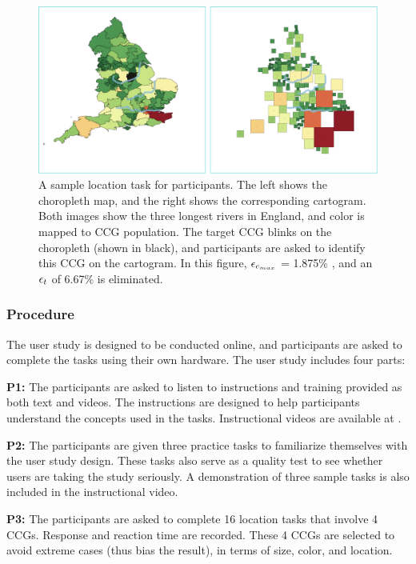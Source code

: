     {
        \begin{figure}[tb!]
            \centering
            \includegraphics[width=\columnwidth,keepaspectratio]{figure/evaluation/task.png}
            \caption{A sample location task for participants. The left shows the choropleth map, and the right shows the corresponding cartogram. Both images show the three longest rivers in England, and color is mapped to CCG population. The target CCG blinks on the choropleth (shown in black), and participants are asked to identify this CCG on the cartogram. In this figure, $ \epsilon_{c_{max}} $ = 1.875\% , and an $ \epsilon_{t} $ of 6.67\% is eliminated. }
            \label{fig:task}
        \end{figure}
    }

\subsubsection{Procedure}

The user study is designed to be conducted online, and participants are asked to complete the tasks using their own hardware. The user study includes four parts:

\textbf{P1:} The participants are asked to listen to instructions and training provided as both text and videos. The instructions are designed to help participants understand the concepts used in the tasks. Instructional videos are available at .

\textbf{P2:} The participants are given three practice tasks to familiarize themselves with the user study design. These tasks also serve as a quality test to see whether users are taking the study seriously. A demonstration of three sample tasks is also included in the instructional video.

\textbf{P3:} The participants are asked to complete 16 location tasks that involve 4 CCGs. Response and reaction time are recorded. These 4 CCGs are selected to avoid extreme cases (thus bias the result), in terms of size, color, and location.

